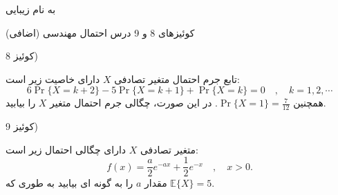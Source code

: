\documentclass{article}
\newcommand{\eqn}[1]{
\[\begin{split}
#1
\end{split}\]
}
\begin{document}
\LARGE
\begin{center}

به نام زیبایی


کوئیزهای 8 و 9 درس احتمال مهندسی (اضافی)

\end{center}
\hrulefill
\large

کوئیز 8)

تابع جرم احتمال متغیر تصادفی $X$ دارای خاصیت زیر است:
$$
6\Pr\{X=k+2\}-5\Pr\{X=k+1\}+\Pr\{X=k\}=0\quad,\quad k=1,2,\cdots
$$
همچنین 
$
\Pr\{X=1\}=\frac{7}{12}
$.
در این صورت، چگالی جرم احتمال متغیر $X$ را بیابید.

کوئیز 9)

متغیر تصادفی $X$ دارای چگالی احتمال زیر است:
$$
f(x)=\frac{a}{2}e^{-ax}+\frac{1}{2}e^{-x}\quad,\quad x>0.
$$
مقدار $a$ را به گونه ای بیابید به طوری که
$
\mathbb{E}\{X\}=5
$.


\end{document}
